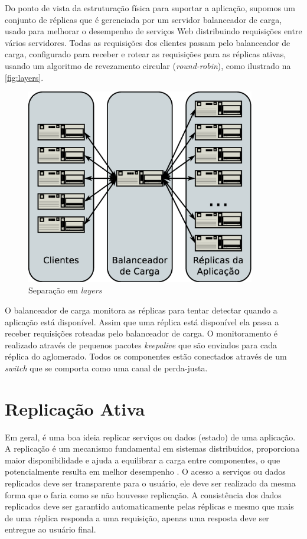 Do ponto de vista da estruturação física para suportar a aplicação, supomos um conjunto de
réplicas que é gerenciada por um servidor balanceador de carga, usado para melhorar o
desempenho de serviços Web distribuindo requisições entre vários servidores. Todas as
requisições dos clientes passam pelo balanceador de carga, configurado para receber e
rotear as requisições para as réplicas ativas, usando um algoritmo de revezamento circular
(\emph{round-robin}), como ilustrado na \autoref{fig:layers}.

\begin{figure}[ht]
  \centering
  \includegraphics[width=10cm]{conteudo/capitulos/figuras/layers.eps}
  \caption{Separação em \emph{layers}}
  \label{fig:layers}
\end{figure}

O balanceador de carga monitora as réplicas para tentar detectar quando a aplicação está
disponível. Assim que uma réplica está disponível ela passa a receber requisições roteadas
pelo balanceador de carga. O monitoramento é realizado através de pequenos pacotes
\emph{keepalive} que são enviados para cada réplica do aglomerado. Todos os componentes
estão conectados através de um \emph{switch} que se comporta como uma canal de perda-justa.


\section{Replicação Ativa}\label{sec:replicacao-ativa}

Em geral, é uma boa ideia replicar serviços ou dados (estado) de uma aplicação. A
replicação é um mecanismo fundamental em sistemas distribuídos, proporciona maior
disponibilidade e ajuda a equilibrar a carga entre componentes, o que potencialmente
resulta em melhor desempenho \cite{tanenbaum07}. O acesso a serviços ou dados replicados
deve ser transparente para o usuário, ele deve ser realizado da mesma forma que o faria
como se não houvesse replicação. A consistência dos dados replicados deve ser garantido
automaticamente pelas réplicas e mesmo que mais de uma réplica responda a uma requisição,
apenas uma resposta deve ser entregue ao usuário final.

